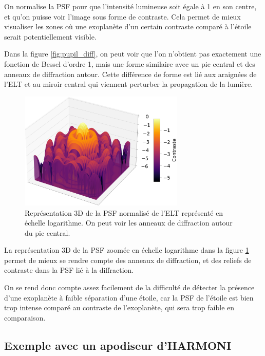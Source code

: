 On normalise la PSF pour que l'intensité lumineuse soit égale à 1 en son centre, et qu'on puisse voir l'image sous forme de contraste. Cela permet de mieux visualiser les zones où une exoplanète d'un certain contraste comparé à l'étoile serait potentiellement visible.

Dans la figure \ref{fig:pupil_diff}, on peut voir que l'on n'obtient pas exactement une fonction de Bessel d'ordre 1, mais une forme similaire avec un pic central et des anneaux de diffraction autour. Cette différence de forme est lié aux araignées de l'ELT et au miroir central qui viennent perturber la propagation de la lumière.

\begin{figure}[htbp]
\centering
\includegraphics[width=0.7\textwidth]{figures/PSF_ELT_3D_bord.png}
\caption{Représentation 3D de la PSF normalisé de l'ELT représenté en échelle logarithme. On peut voir les anneaux de diffraction autour du pic central.}
\label{fig:3D_PSF}
\end{figure}


La représentation 3D de la PSF zoomée en échelle logarithme dans la figure \ref{fig:3D_PSF} permet de mieux se rendre compte des anneaux de diffraction, et des reliefs de contraste dans la PSF lié à la diffraction.

On se rend donc compte assez facilement de la difficulté de détecter la présence d'une exoplanète à faible séparation d'une étoile, car la PSF de l'étoile est bien trop intense comparé au contraste de l'exoplanète, qui sera trop faible en comparaison.



\subsection{Exemple avec un apodiseur d'HARMONI}


